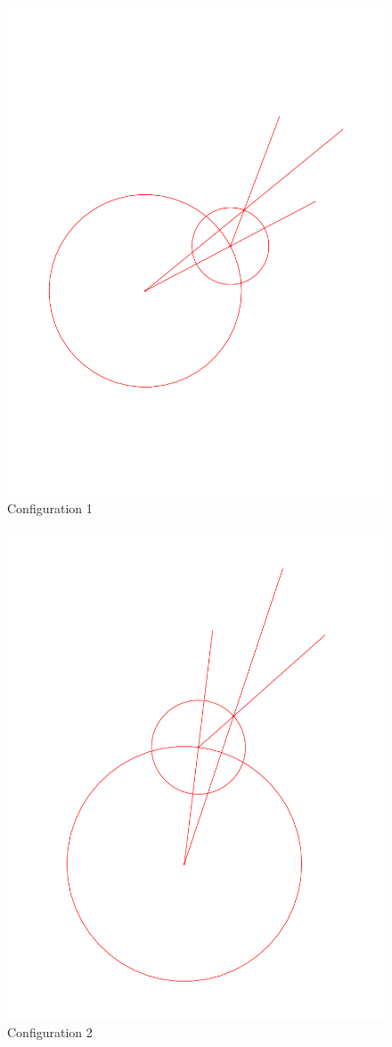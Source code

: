\begin{enumerate}
\end{enumerate}
\begin{figure}
	\centering
	\includegraphics[scale=0.5]{Eplanicom_2.pdf}
	\caption{Configuration 1}
\end{figure}
\begin{figure}
	\centering
	\includegraphics[scale=0.5]{Eplanicom_3.pdf}
	\caption{Configuration 2}
\end{figure}
